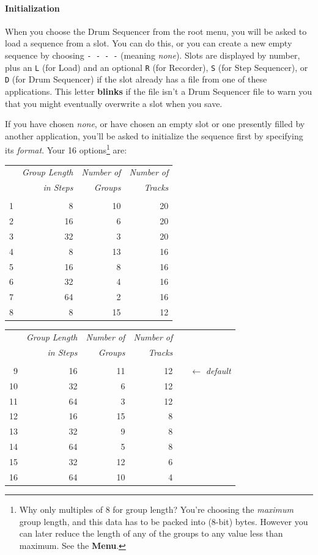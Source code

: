 \documentclass{article}
\begin{document}
\paragraph{Initialization} When you choose the Drum Sequencer from the root menu, you will be asked to load a sequence from a slot.  You can do this, or you can create a new empty sequence by choosing \texttt{-~-~-~-} (meaning {\it none}).  Slots are displayed by number, plus an \texttt{L} (for Load) and an optional \texttt{R} (for Recorder), \texttt{S} (for Step Sequencer), or \texttt{D} (for Drum Sequencer) if the slot already has a file from one of these applications.  This letter {\bf blinks} if the file isn't a Drum Sequencer file to warn you that you might eventually overwrite a slot when you save.

If you have chosen {\it none}, or have chosen an empty slot or one presently filled by another application, you'll be asked to initialize the sequence first by specifying its {\it format}.  Your 16 options\footnote{Why only multiples of 8 for group length?  You're choosing the {\it maximum} group length, and this data has to be packed into (8-bit) bytes.  However you can later reduce the length of any of the groups to any value less than maximum.  See the \textbf{Menu}.} are:

\vspace{0.5em}\begin{center}{\small\noindent\begin{tabular}{@{}rrrr@{}}
&\it Group Length&\it Number of&\it Number of\\
&\it in Steps&\it Groups&\it Tracks\\
\hline\\[-0.9em]
1&8&10&20\\
2&16&6&20\\
3&32&3&20\\
4&8&13&16\\
5&16&8&16\\
6&32&4&16\\
7&64&2&16\\
8&8&15&12\\
 \end{tabular}%
\hspace{8em}\begin{tabular}{@{}rrrr@{}r@{}}
&\it Group Length&\it Number of&\it Number of\\
&\it in Steps&\it Groups&\it Tracks\\
\cline{1-4}\\[-0.9em]
9&16&11&12&\ \ \(\longleftarrow\) {\it default}\\
10&32&6&12\\
11&64&3&12\\
12&16&15&8\\
13&32&9&8\\
14&64&5&8\\
15&32&12&6\\
16&64&10&4\\
 \end{tabular}}\end{center}
 \vspace{-0.5em}
 
\end{document}
